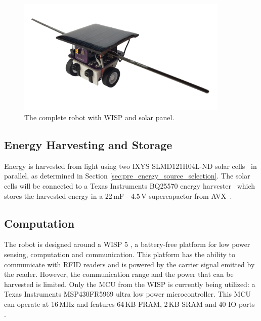 \begin{figure}[h!]
	\centering
	\includegraphics[width=0.9\textwidth]{pics/tp_robot.png}
	\caption{The complete robot with WISP and solar panel.}
	\label{fig:robot_picture}
\end{figure}

\subsection{Energy Harvesting and Storage}
Energy is harvested from light using two IXYS SLMD121H04L-ND solar cells~\cite{ixolar_slmd121h04l_2017} in parallel, as determined in Section \ref{sec:pre_energy_source_selection}.
The solar cells will be connected to a Texas Instruments BQ25570 energy harvester~\cite{bq25570_2017} which stores the harvested energy in a 22\,mF - 4.5\,V supercapactor from AVX~\cite{avx_bestcap_2017}.

\subsection{Computation}
\label{sec:dai_computation}

The robot is designed around a WISP 5 \cite{wisp5_wiki_2017}, a battery-free platform for low power sensing, computation and communication.
This platform has the ability to communicate with RFID readers and is powered by the carrier signal emitted by the reader.
However, the communication range and the power that can be harvested is limited. 
Only the MCU from the WISP is currently being utilized: a Texas Instruments MSP430FR5969 ultra low power microcontroller.
This MCU can operate at 16\,MHz and features 64\,KB FRAM, 2\,KB SRAM and 40 IO-ports \cite{msp430fr5969_2017}.



